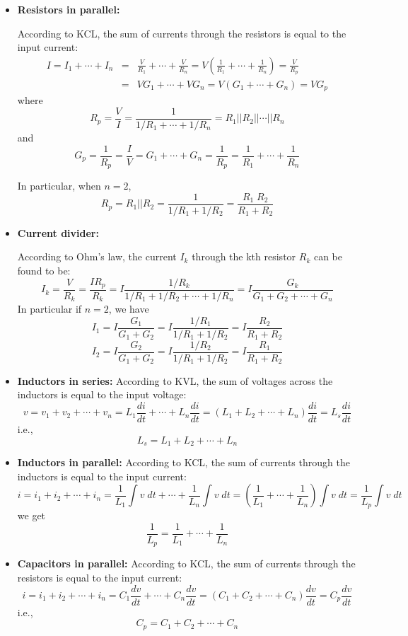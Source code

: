 \begin{itemize}
\begin{itemize}
\item {\bf Resistors in parallel:} 


  According to KCL, the sum of currents through the resistors is equal to 
  the input current:
  \begin{eqnarray}	
    I=I_1+\cdots+I_n&=&\frac{V}{R_1}+\cdots+\frac{V}{R_n}
    =V\left(\frac{1}{R_1}+\cdots+\frac{1}{R_n}\right)=\frac{V}{R_p}	
    \nonumber \\
    &=&VG_1+\cdots+VG_n=V(G_1+\cdots+G_n)=VG_p
    \nonumber
  \end{eqnarray}
  where
  \[ 
  R_p=\frac{V}{I}=\frac{1}{1/R_1+\cdots+1/R_n}=R_1||R_2||\cdots||R_n 
  \]
  and
  \[ 
  G_p=\frac{1}{R_p}=\frac{I}{V}=G_1+\cdots+G_n=\frac{1}{R_p}
  =\frac{1}{R_1}+\cdots+\frac{1}{R_n}
  \]

  In particular, when $n=2$, 
  \[	R_p=R_1||R_2=\frac{1}{1/R_1+1/R_2}=\frac{R_1\;R_2}{R_1+R_2}	\]

\item {\bf Current divider:}

  According to Ohm's law, the current $I_k$ through the kth resistor $R_k$ can be 
  found to be:
  \[ 
  I_k=\frac{V}{R_k}=\frac{IR_p}{R_k}=I\frac{1/R_k}{1/R_1+1/R_2+\cdots+1/R_n}
  =I\frac{G_k}{G_1+G_2+\cdots+G_n} 
  \]
  In particular if $n=2$, we have
  \[ 
  I_1=I\frac{G_1}{G_1+G_2}=I\frac{1/R_1}{1/R_1+1/R_2}
  =I\frac{R_2}{R_1+R_2}
  \]
  \[
  I_2=I\frac{G_2}{G_1+G_2}=I\frac{1/R_2}{1/R_1+1/R_2}
  =I\frac{R_1}{R_1+R_2} 
  \]

\item {\bf Inductors in series:} According to KVL, the sum of voltages across 
  the inductors is equal to the input voltage:
  \[	
  v=v_1+v_2+\cdots+v_n=L_1\frac{di}{dt}+\cdots+L_n\frac{di}{dt}
  =(L_1+L_2+\cdots+L_n)\frac{di}{dt}=L_s\frac{di}{dt}	
  \]
  i.e.,
  \[
  L_s=L_1+L_2+\cdots+L_n	
  \]

\item {\bf Inductors in parallel:} According to KCL, the sum of currents through 
  the inductors is equal to the input current:
  \[	
  i=i_1+i_2+\cdots+i_n
  =\frac{1}{L_1}\int v\; dt+\cdots+\frac{1}{L_n}\int v\; dt 
  =\left(\frac{1}{L_1}+\cdots+\frac{1}{L_n}\right)\int v\; dt
  =\frac{1}{L_p}\int v\; dt	 
  \]
  we get
  \[
  \frac{1}{L_p}=\frac{1}{L_1}+\cdots+\frac{1}{L_n} 
  \]

\item {\bf Capacitors in parallel:} According to KCL, the sum of currents through 
  the resistors is equal to the input current:
  \[	
  i=i_1+i_2+\cdots+i_n=C_1\frac{dv}{dt}+\cdots+C_n\frac{dv}{dt}
  =(C_1+C_2+\cdots+C_n)\frac{dv}{dt} =C_p\frac{dv}{dt}		
  \]
  i.e.,
  \[	C_p=C_1+C_2+\cdots+C_n	\]


\end{itemize}
\end{itemize}
